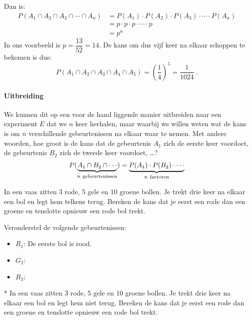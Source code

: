 \documentclass[12pt,twoside]{article}
\begin{document}
Dan is:
\begin{align*}
  P(A_1\cap A_2 \cap A_3\cap \cdots \cap A_n)&=P(A_1)\cdot P(A_2)\cdot P(A_3)\cdot \cdots \cdot P(A_n)\\
                                             &=p\cdot p\cdot p\cdot \cdots \cdot p\\
                                             &= p^n
\end{align*}
In ons voorbeeld is $p=\dfrac{13}{52}={1}{4}$. De kans om dus vijf keer na elkaar schoppen te bekomen is dus:
$$P(A_1\cap A_2 \cap A_3\cap A_4 \cap A_5)=\left(\dfrac{1}{4}\right)^5=\dfrac{1}{1024}\;.$$

\paragraph*{Uitbreiding} We kunnen dit op een voor de hand liggende manier uitbreiden naar een experiment $E$ dat we $n$ keer herhalen, maar waarbij we willen weten wat de kans is om $n$ verschillende gebeurtenissen na elkaar waar te nemen. Met andere woorden, hoe groot is de kans dat de gebeurtenis $A_1$ zich de eerste keer voordoet, de gebeurtenis $B_2$ zich de tweede keer voordoet, \ldots?
$$P(\underbrace{A_1\cap B_2\cap\cdots}_{n\mbox{ \scriptsize gebeurtenissen}})=\underbrace{P(A_1)\cdot P(B_2)\cdot \cdots}_{n\mbox{ \scriptsize factoren}}$$

\begin{oefening}
In een vaas zitten 3 rode, 5 gele en 10 groene bollen. Je trekt drie keer na elkaar een bol en legt hem telkens terug. Bereken de kans dat je eerst een rode dan een groene en tenslotte opnieuw een rode bol trekt.

Veronderstel de volgende gebeurtenissen:
\begin{itemize}
  \itemsep0.2em
  \item $R_1$: De eerste bol is rood.
  \item $G_2$: \arulefill
  \item $R_3$: \arulefill
\end{itemize}
\vspace*{0.1cm}
\end{oefening}

\begin{oefening}*
In een vaas zitten 3 rode, 5 gele en 10 groene bollen. Je trekt drie keer na elkaar een bol en legt hem niet terug. Bereken de kans dat je eerst een rode dan een groene en tenslotte opnieuw een rode bol trekt.
\end{oefening}
\end{document}
